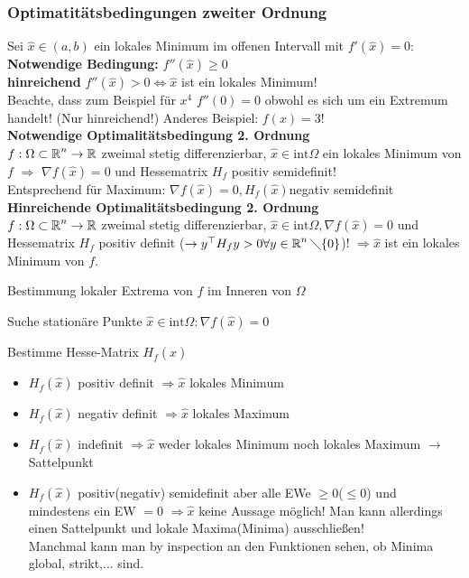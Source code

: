 \documentclass[german]{latex4ei/latex4ei_sheet}
\begin{document}
\subsubsection{Optimatit\"atsbedingungen zweiter Ordnung}
Sei $\hat{x} \in (a,b)$ ein lokales Minimum im offenen Intervall mit $f'(\hat{x})=0$:\\
\textbf{Notwendige Bedingung:}  $f''(\hat{x}) \ge 0$\\
\textbf{hinreichend} $f''(\hat{x}) > 0 \Leftrightarrow \hat{x}$ ist ein lokales Minimum!\\
Beachte, dass zum Beispiel f\"ur $x^4$ $f''(0)=0$ obwohl es sich um ein Extremum handelt! (Nur hinreichend!)
Anderes Beispiel: $f(x)=3$!\\
\textbf{Notwendige Optimalit\"atsbedingung 2. Ordnung}\\
$f:\Omega \subset \operatorname{\mathbb R}^n \to \operatorname{\mathbb R}$ zweimal stetig differenzierbar, $\hat{x} \in \mathrm{int}\Omega$ ein lokales Minimum von $f$ $\Rightarrow$ $\nabla f(\hat{x})=0$ und Hessematrix $H_f$ positiv semidefinit!\\
Entsprechend f\"ur Maximum: $\nabla f(\hat{x})=0, H_f(\hat{x}) $negativ semidefinit\\
\textbf{Hinreichende Optimalit\"atsbedingung 2. Ordnung}\\
$f:\Omega \subset \operatorname{\mathbb R}^n \to \operatorname{\mathbb R}$ zweimal stetig differenzierbar, $\hat{x} \in \mathrm{int}\Omega,\nabla f(\hat{x})=0$ und Hessematrix $H_f$ positiv definit ($\rightarrow y^\top H_f y > 0 \forall y \in \operatorname{\mathbb R}^n \diagdown \{0\}$)! $\Rightarrow \hat{x}$ ist ein lokales Minimum von $f$. \\

\begin{cookbox}{Bestimmung lokaler Extrema von $f$ im Inneren von $\Omega$}
\item Suche station\"are Punkte $\hat{x} \in \mathrm{int}\Omega: \nabla f(\hat{x})=0$
\item Bestimme Hesse-Matrix $H_f(\hat{x})$\\
\begin{itemize}
\item $H_f(\hat{x})$ positiv definit $\Rightarrow \hat{x}$ lokales Minimum
\item $H_f(\hat{x})$ negativ definit $\Rightarrow \hat{x}$ lokales Maximum
\item $H_f(\hat{x})$ indefinit $\Rightarrow \hat{x}$ weder lokales Minimum noch lokales Maximum $\rightarrow$ Sattelpunkt
\item $H_f(\hat{x})$ positiv(negativ) semidefinit aber alle EWe $\ge0$($\le 0$) und mindestens ein EW $=0$ $\Rightarrow \hat{x}$ keine Aussage m\"oglich! Man kann allerdings einen Sattelpunkt und lokale Maxima(Minima) ausschlie\ss{}en!\\
Manchmal kann man by inspection an den Funktionen sehen, ob Minima global, strikt,... sind.
\end{itemize}
\end{cookbox}
\end{document}
